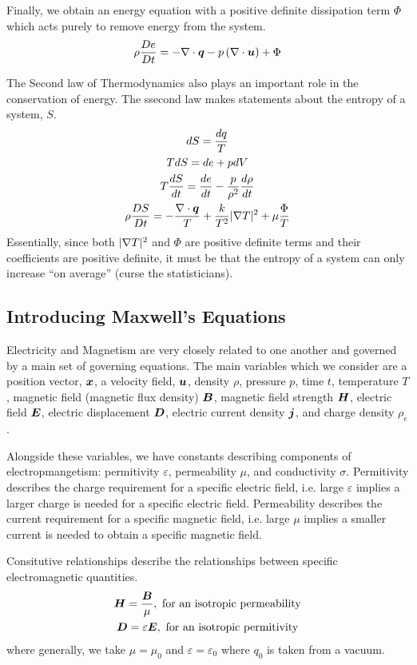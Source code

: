 \documentclass{article}
\begin{document}
Finally, we obtain an energy equation with a positive definite dissipation term
$\Phi$ which acts purely to remove energy from the system. 
\begin{gather*}
    \rho\frac{D e}{D t} = -\nabla \cdot \boldsymbol{q} - p\left(\nabla\cdot\boldsymbol{u}\right) + \Phi
\end{gather*}

The Second law of Thermodynamics also plays an important role in the
conservation of energy. The ssecond law makes statements about the entropy of a
system, $S$.
\begin{gather*}
    dS = \frac{dq}{T}\\
    TdS =  de + pdV\\
    T\frac{d S}{d t} = \frac{d e}{d t} - \frac{p}{\rho^2}\frac{d \rho}{d t}\\
    \rho \frac{D S}{D t} = - \frac{\nabla \cdot \boldsymbol{q}}{T} + \frac{k}{T^2}|
    \nabla T|^2 + \mu\frac{\Phi}{T}
\end{gather*}
Essentially, since both $|\nabla T|^2$ and $\Phi$ are positive definite terms and
their coefficients are positive definite, it must be that the entropy of a
system can only increase ``on average'' (curse the statisticians). 

\subsection{Introducing Maxwell's Equations}

Electricity and Magnetism are very closely related to one another and governed
by a main set of governing equations. The main variables which we consider are a
position vector, $\boldsymbol{x}$, a velocity field, $\boldsymbol{u}$, density $\rho$, pressure
$p$, time $t$, temperature $T$, magnetic field (magnetic flux density) $\boldsymbol{B}$,
magnetic field strength $\boldsymbol{H}$, electric field $\boldsymbol{E}$, electric displacement
$\boldsymbol{D}$, electric current density $\boldsymbol{j}$, and charge density $\rho_e$. 

Alongside these variables, we have constants describing components of
electropmangetism: permitivity $\varepsilon$, permeability $\mu$, and
conductivity $\sigma$. Permitivity describes the charge requirement for a
specific electric field, i.e. large $\varepsilon$ implies a larger charge is
needed for a specific electric field. Permeability describes the current
requirement for a specific magnetic field, i.e. large $\mu$ implies a smaller
current is needed to obtain a specific magnetic field. 

Consitutive relationships describe the relationships between specific
electromagnetic quantities. 
\begin{gather*}
    \boldsymbol{H} = \frac{\boldsymbol{B}}{\mu}, \text{ for an isotropic permeability}\\
    \boldsymbol{D} = \varepsilon \boldsymbol{E}, \text{ for an isotropic permitivity}
\end{gather*}
where generally, we take $\mu = \mu_0$ and $\varepsilon = \varepsilon_0$ where
$q_0$ is taken from a vacuum. 
\end{document}
